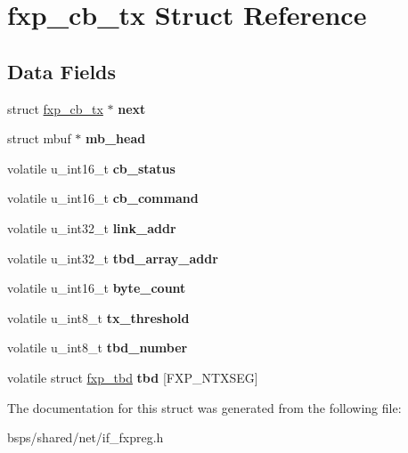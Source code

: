 \hypertarget{structfxp__cb__tx}{}\section{fxp\+\_\+cb\+\_\+tx Struct Reference}
\label{structfxp__cb__tx}
\subsection*{Data Fields}
\begin{DoxyCompactItemize}
\item 
\mbox{\label{structfxp__cb__tx_a27f15797ac73bbf196e4d76667b71300}} 
struct \mbox{\hyperlink{structfxp__cb__tx}{fxp\+\_\+cb\+\_\+tx}} $\ast$ {\bfseries next}
\item 
\mbox{\label{structfxp__cb__tx_ad662f6d022deb0d539774145916f6958}} 
struct mbuf $\ast$ {\bfseries mb\+\_\+head}
\item 
\mbox{\label{structfxp__cb__tx_a229e84fe37f4c85477f3302386fcd99f}} 
volatile u\+\_\+int16\+\_\+t {\bfseries cb\+\_\+status}
\item 
\mbox{\label{structfxp__cb__tx_aaa7fc2bdbede8d05c1469eb4458a3a01}} 
volatile u\+\_\+int16\+\_\+t {\bfseries cb\+\_\+command}
\item 
\mbox{\label{structfxp__cb__tx_a96c9435546ad72149a71e000c50cf97d}} 
volatile u\+\_\+int32\+\_\+t {\bfseries link\+\_\+addr}
\item 
\mbox{\label{structfxp__cb__tx_ada8eda38641f5134a803ecfdd0564c3d}} 
volatile u\+\_\+int32\+\_\+t {\bfseries tbd\+\_\+array\+\_\+addr}
\item 
\mbox{\label{structfxp__cb__tx_ad06b45186c54befac648c163e06567b4}} 
volatile u\+\_\+int16\+\_\+t {\bfseries byte\+\_\+count}
\item 
\mbox{\label{structfxp__cb__tx_a7fab81e1b0f817015c9de0ea3e60169e}} 
volatile u\+\_\+int8\+\_\+t {\bfseries tx\+\_\+threshold}
\item 
\mbox{\label{structfxp__cb__tx_ac9de07001c989e5af209da1abdcb9e2b}} 
volatile u\+\_\+int8\+\_\+t {\bfseries tbd\+\_\+number}
\item 
\mbox{\label{structfxp__cb__tx_a0a0917a7a9e2c7d6c298dc0cc814c387}} 
volatile struct \mbox{\hyperlink{structfxp__tbd}{fxp\+\_\+tbd}} {\bfseries tbd} \mbox{[}F\+X\+P\+\_\+\+N\+T\+X\+S\+EG\mbox{]}
\end{DoxyCompactItemize}


The documentation for this struct was generated from the following file\+:\begin{DoxyCompactItemize}
\item 
bsps/shared/net/if\+\_\+fxpreg.\+h\end{DoxyCompactItemize}
